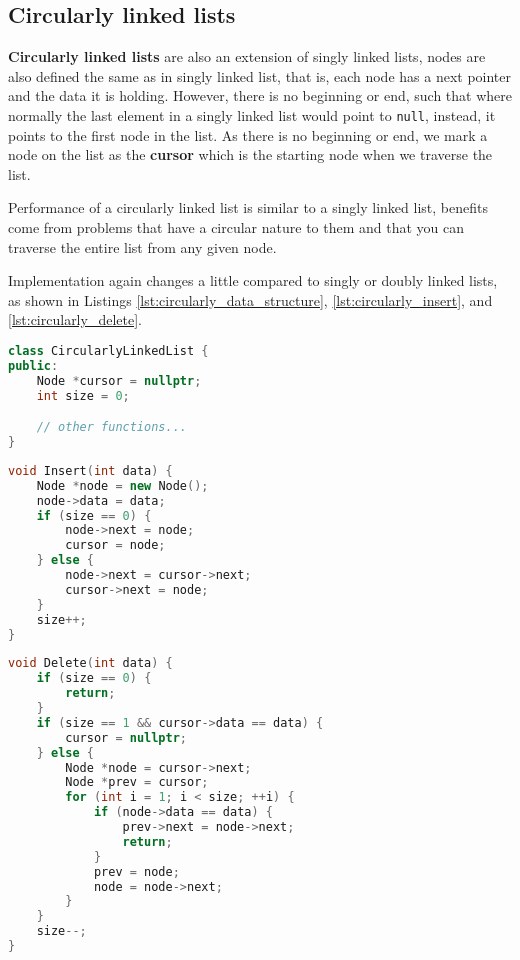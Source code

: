 \subsection{Circularly linked lists}

\begin{definition}
    \textbf{Circularly linked lists} are also an extension of singly linked lists, nodes are also defined the same as in singly linked list, that is, each node has a next pointer and the data it is holding. However, there is no beginning or end, such that where normally the last element in a singly linked list would point to \texttt{null}, instead, it points to the first node in the list. As there is no beginning or end, we mark a node on the list as the \textbf{cursor} which is the starting node when we traverse the list.
\end{definition}

Performance of a circularly linked list is similar to a singly linked list, benefits come from problems that have a circular nature to them and that you can traverse the entire list from any given node. 

Implementation again changes a little compared to singly or doubly linked lists, as shown in Listings \ref{lst:circularly_data_structure}, \ref{lst:circularly_insert}, and \ref{lst:circularly_delete}.

\begin{lstlisting}[float,
                  language = C++,
                  caption = {Circularly linked list data structure in C++.},
                  label = lst:circularly_data_structure]
class CircularlyLinkedList {
public:
    Node *cursor = nullptr;
    int size = 0;

    // other functions...
}
\end{lstlisting}

\begin{lstlisting}[float,
                  language = C++,
                  caption = {Insert function for circularly linked list data structure in C++.},
                  label = lst:circularly_insert]
void Insert(int data) {
    Node *node = new Node();
    node->data = data;
    if (size == 0) {
        node->next = node;
        cursor = node;
    } else {
        node->next = cursor->next;
        cursor->next = node;
    }
    size++;
}
\end{lstlisting}

\begin{lstlisting}[float,
                  language = C++,
                  caption = {Delete function for circularly linked list data structure in C++.},
                  label = lst:circularly_delete]
void Delete(int data) {
    if (size == 0) {
        return;
    }
    if (size == 1 && cursor->data == data) {
        cursor = nullptr;
    } else {
        Node *node = cursor->next;
        Node *prev = cursor;
        for (int i = 1; i < size; ++i) {
            if (node->data == data) {
                prev->next = node->next;
                return;
            }
            prev = node;
            node = node->next;
        }
    }
    size--;
}
\end{lstlisting}


